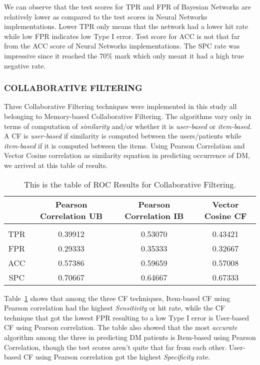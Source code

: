 \documentclass[journal]{./IEEE/IEEEtran}
\begin{document}
We can observe that the test scores for TPR and FPR of Bayesian Networks are relatively lower as compared to the test scores in Neural Networks implementations. Lower TPR only means that the network had a lower hit rate while low FPR indicates low Type I error. Test score for ACC is not that far from the ACC score of Neural Networks implementations. The SPC rate was impressive since it reached the 70\% mark which only meant it had a high true negative rate.

\subsubsection {COLLABORATIVE FILTERING}
Three Collaborative Filtering techniques were implemented in this study all belonging to Memory-based Collaborative Filtering. The algorithms vary only in terms of computation of {\it similarity} and/or whether it is {\it user-based} or {\it item-based}. A CF is {\it user-based} if similarity is computed between the users/patients while {\it item-based} if it is computed between the items. Using Pearson Correlation and Vector Cosine correlation as similarity equation in predicting occurrence of DM, we arrived at this table of results.
 
\begin{table}[ht] 
\caption{This is the table of ROC Results for Collaborative Filtering.} %
\tabcolsep=0.10cm
\begin{tabular}{cccc} 
\hline\hline %
~ & Pearson Correlation UB & Pearson Correlation IB & Vector Cosine CF\\ [0.5ex] %
\hline\\[0.1ex] %
TPR & 0.39912 & 0.53070 & 0.43421 \\ %
FPR & 0.29333 & 0.35333 & 0.32667 \\ 
ACC & 0.57386 & 0.59659 & 0.57008 \\ 
SPC & 0.70667 & 0.64667 & 0.67333 \\[1ex] %
\hline %
\end{tabular} 
\label{table:four} %
\end{table} 

Table~\ref{table:four} shows that among the three CF techniques, Item-based CF using Pearson correlation had the highest {\it Sensitivity} or hit rate, while the CF technique that got the lowest FPR resulting to a low Type I error is User-based CF using Pearson correlation. The table also showed that the most {\it accurate} algorithm among the three in predicting DM patients is Item-based using Pearson Correlation, though the test scores aren't quite that far from each other. User-based CF using Pearson correlation got the highest {\it Specificity} rate.
\end{document}
